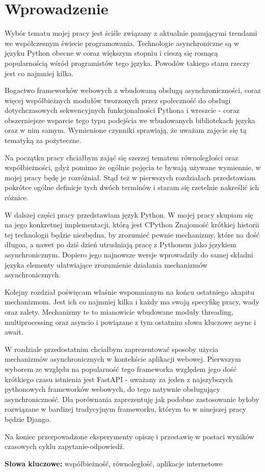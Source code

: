 \chapter{Wprowadzenie}

Wybór tematu mojej pracy jest ściśle związany z aktualnie panującymi trendami we współczesnym świecie programowania. Technologie asynchroniczne są w języku Python obecne w coraz większym stopniu i cieszą się rosnącą popularnością wśród programistów tego języka. Powodów takiego stanu rzeczy jest co najmniej kilka. 

Bogactwo frameworków webowych z wbudowaną obsługą asynchroniczności, coraz więcej współbieżnych modułów tworzonych przez społeczność do obsługi dotychczasowych sekwencyjnych funkcjonalności Pythona i wreszcie - coraz obszerniejsze wsparcie tego typu podejścia we wbudowanych bibliotekach języka oraz  w nim samym. Wymienione czynniki sprawiają, że uważam zajęcie się tą tematyką za pożyteczne.

Na początku pracy chciałbym zająć się szerzej tematem równoległości oraz współbieżności, gdyż pomimo że ogólnie pojęcia te bywają używane wymiennie, w mojej pracy będę je rozróżniał. Stąd też w pierwszych rozdziałach przedstawiam pokrótce ogólne definicje tych dwóch terminów i staram się rzetelnie nakreślić ich różnice.

W dalszej części pracy przedstawiam język Python. W mojej pracy skupiam się na jego konkretnej implementacji, którą jest CPython Znajomość krótkiej historii tej technologii będzie niezbędna, by zrozumieć pewnie mechanizmy, które na dość długoa, a nawet po dziś dzień utrudniają pracę z Pythonem jako językiem asynchronicznym. Dopiero jego najnowsze wersje wprowadziły do samej składni języka elementy ułatwiające zrozumienie działania mechanizmów asynchronicznych.

Kolejny rozdział poświęcam właśnie wspomnianym na końcu ostatniego akapitu mechanizmom. Jest ich co najmniej kilka i każdy ma swoją specyfikę pracy, wady oraz zalety. Mechanizmy te to mianowicie wbudowane moduły threading, multiprocessing oraz asyncio i powiązane z tym ostatnim słowa kluczowe async i await.

W rozdziale przedostatnim chciałbym zaprezentować sposoby użycia mechanizmów asynchronicznych w kontekście aplikacji webowej. Pierwszym wyborem ze względu na popularność tego frameworka względem jego dość krótkiego czasu istnienia jest FastAPI - uważany za jeden z najszybszych pythonowych frameworków webowych, do tego natywnie obsługujący asynchroniczność. Dla porównania zaprezentuję jak podobne zastosowanie byłoby rozwiązane w bardizej tradycyjnym frameworku, którym to w ninejszej pracy będzie Django.

Na koniec przerpowadzone eksperymenty opiszę i przestawię w postaci wyników czasowych cyklu zapytanie-odpowiedź.

\textbf{Słowa kluczowe:} współbieżność, równoległość, aplikacje internetowe